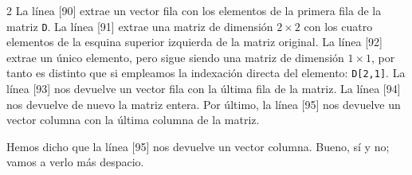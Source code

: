 \begin{paracol}{2}
La línea [90] extrae un vector fila con los elementos de la primera fila de la matriz \texttt{D}. La línea [91] extrae una matriz de dimensión $2\times 2$ con los cuatro elementos de la esquina superior izquierda de la matriz original. La línea [92] extrae un único elemento, pero sigue siendo una matriz de dimensión $1 \times 1$, por tanto es distinto que si empleamos la indexación directa del elemento: \texttt{D[2,1]}. La línea [93] nos devuelve un vector fila con la última fila de la matriz. La línea [94] nos devuelve de nuevo la matriz entera. Por último, la línea [95] nos devuelve un vector columna con la última columna de la matriz.

Hemos dicho que la línea [95] nos devuelve un vector columna. Bueno, sí y no; vamos a verlo más despacio.


\end{paracol}
